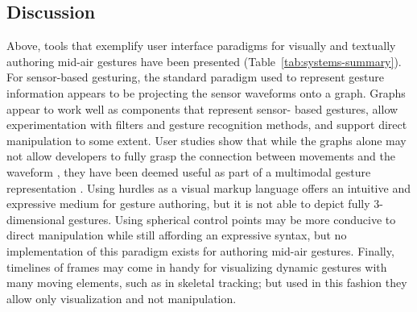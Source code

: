 \subsection{Discussion}

Above, tools that exemplify user interface paradigms for visually and textually authoring mid-air gestures have been presented (Table~\ref{tab:systems-summary}). For sensor-based gesturing, the standard paradigm used to represent gesture information appears to be projecting the sensor waveforms onto a graph. Graphs appear to work well as components that represent sensor- based gestures, allow experimentation with filters and gesture recognition methods, and support direct manipulation to some extent. User studies show that while the graphs alone may not allow developers to fully grasp the connection between movements and the waveform \parencite{Ashbrook:2010}, they have been deemed useful as part of a multimodal gesture representation \parencite{Zamborlin:2014}. Using hurdles as a visual markup language offers an intuitive and expressive medium for gesture authoring, but it is not able to depict fully 3-dimensional gestures. Using spherical control points may be more conducive to direct manipulation while still affording an expressive syntax, but no implementation of this paradigm exists for authoring mid-air gestures. Finally, timelines of frames may come in handy for visualizing dynamic gestures with many moving elements, such as in skeletal tracking; but used in this fashion they allow only visualization and not manipulation.

